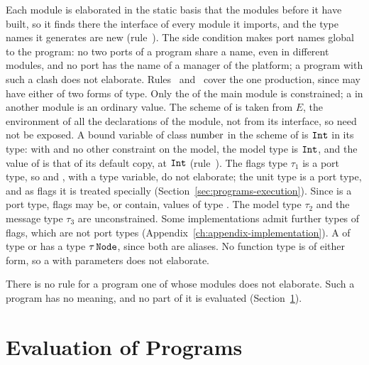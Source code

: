 \begin{rulecomments}
 Each module is elaborated in the static basis that
the modules before it have built, so it finds there the interface of every
module it imports, and the type names it generates are new
(rule~). The side condition makes port names global to
the program: no two ports of a program share a name, even in different
modules, and no port has the name of a manager of the platform; a program
with such a clash does not elaborate. %
 Rules~
and~ cover the one production, since 
may have either of two forms of type. Only the  of the main module
is constrained; a  in another module is an ordinary value. %
The scheme of  is taken from $E$, the environment of all the
declarations of the module, not from its interface, so  need not be
exposed. %
A bound variable of class $\mathrm{number}$ in the scheme of  is $\mathtt{Int}$ in
its type: with  and no other
constraint on the model, the model type is $\mathtt{Int}$, and the value of
 is that of its default copy, at $\mathtt{Int}$
(rule~). %
The flags type $\tau_1$ is a port type, so  and , with  a type
variable, do not elaborate; the unit type is a port type, and as flags it is
treated specially (Section~\ref{sec:programs-execution}). Since 
is a port type, flags may be, or contain, values of type . %
The model type $\tau_2$ and the message type $\tau_3$ are unconstrained. Some
implementations admit further types of flags, which are not port types
(Appendix~\ref{ch:appendix-implementation}).
 A  of type  or
 has a type $\tau\,\mathtt{Node}$, since both are aliases. No function
type is of either form, so a  with parameters does not elaborate. %
\end{rulecomments}

There is no rule for a program one of whose modules does not elaborate. Such
a program has no meaning, and no part of it is evaluated
(Section~\ref{sec:programs-evaluation}).

\section{Evaluation of Programs}\label{sec:programs-evaluation}

